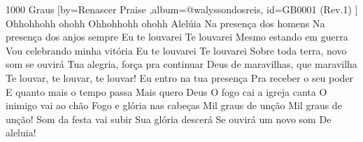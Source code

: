 \beginsong
{1000 Graus %
}[by={Renascer Praise %
},album={@walyssondosreis},
id={GB0001 %
(Rev.1) %
}]
\beginverse
Ohhohhohh ohohh
Ohhohhohh ohohh
Alelúia
\endverse
\beginverse
Na presença dos homens
Na presença dos anjos sempre
Eu te louvarei
Te louvarei
\endverse
\beginverse
Mesmo estando em guerra
Vou celebrando minha vitória
Eu te louvarei
Te louvarei
\endverse
\beginverse
Sobre toda terra, novo som se ouvirá
Tua alegria, força pra continuar
Deus de maravilhas, que maravilha
Te louvar, te louvar, te louvar!
\endverse
\beginchorus
Eu entro na tua presença
Pra receber o seu poder
E quanto mais o tempo passa
Mais quero Deus
O fogo cai a igreja canta
O inimigo vai ao chão
Fogo e glória nas cabeças
Mil graus de unção
Mil graus de unção!
\endchorus
\beginverse
Som da festa vai subir
Sua glória descerá
Se ouvirá um novo som
De aleluia!

